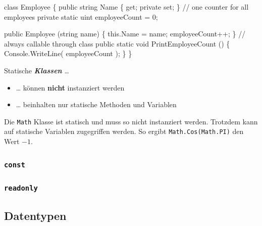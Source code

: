 \documentclass[
  9pt,
  a4paperpaper,
  DIV=11]{scrartcl}
\newenvironment{Shaded}{}{}
\newcommand{\CommentTok}[1]{\textcolor[rgb]{0.42,0.45,0.49}{#1}}
\newcommand{\DataTypeTok}[1]{\textcolor[rgb]{0.84,0.23,0.29}{#1}}
\newcommand{\DecValTok}[1]{\textcolor[rgb]{0.00,0.36,0.77}{#1}}
\newcommand{\FunctionTok}[1]{\textcolor[rgb]{0.44,0.26,0.76}{#1}}
\newcommand{\KeywordTok}[1]{\textcolor[rgb]{0.84,0.23,0.29}{#1}}
\newcommand{\NormalTok}[1]{\textcolor[rgb]{0.14,0.16,0.18}{#1}}
\newcommand{\OperatorTok}[1]{\textcolor[rgb]{0.14,0.16,0.18}{#1}}
\providecommand{\tightlist}{%
  \setlength{\itemsep}{0pt}\setlength{\parskip}{0pt}}\usepackage{longtable,booktabs,array}
\numberwithin{equation}{section}
\begin{document}
\begin{multicols}{2}
\begin{Shaded}
\begin{Highlighting}[]
\KeywordTok{class}\NormalTok{ Employee }\OperatorTok{\{}
  \KeywordTok{public} \DataTypeTok{string}\NormalTok{ Name }\OperatorTok{\{} \KeywordTok{get}\OperatorTok{;} \KeywordTok{private} \KeywordTok{set}\OperatorTok{;} \OperatorTok{\}}
  \CommentTok{// one counter for all employees}
  \KeywordTok{private} \KeywordTok{static} \DataTypeTok{uint}\NormalTok{ employeeCount }\OperatorTok{=} \DecValTok{0}\OperatorTok{;}

  \KeywordTok{public} \FunctionTok{Employee} \OperatorTok{(}\DataTypeTok{string}\NormalTok{ name}\OperatorTok{)} \OperatorTok{\{}
    \KeywordTok{this}\OperatorTok{.}\FunctionTok{Name} \OperatorTok{=}\NormalTok{ name}\OperatorTok{;}
\NormalTok{    employeeCount}\OperatorTok{++;}
  \OperatorTok{\}}
  \CommentTok{// always callable through class}
  \KeywordTok{public} \KeywordTok{static} \DataTypeTok{void} \FunctionTok{PrintEmployeeCount} \OperatorTok{()} \OperatorTok{\{}
\NormalTok{    Console}\OperatorTok{.}\FunctionTok{WriteLine}\OperatorTok{(}\NormalTok{ employeeCount }\OperatorTok{);}
  \OperatorTok{\}}
\OperatorTok{\}}
\end{Highlighting}
\end{Shaded}

Statische \textbf{\emph{Klassen}} \ldots{}

\begin{itemize}
\tightlist
\item
  \ldots{} können \textbf{nicht} instanziert werden
\item
  \ldots{} beinhalten nur statische Methoden und Variablen
\end{itemize}

Die \texttt{Math} Klasse ist statisch und muss so nicht instanziert
werden. Trotzdem kann auf statische Variablen zugegriffen werden. So
ergibt \texttt{Math.Cos(Math.PI)} den Wert \(-1\).

\hypertarget{const}{%
\subsubsection{\texorpdfstring{\texttt{const}}{const}}\label{const}}

\hypertarget{readonly}{%
\subsubsection{\texorpdfstring{\texttt{readonly}}{readonly}}\label{readonly}}

\hypertarget{datentypen}{%
\subsection{Datentypen}\label{datentypen}}


\end{multicols}
\end{document}

